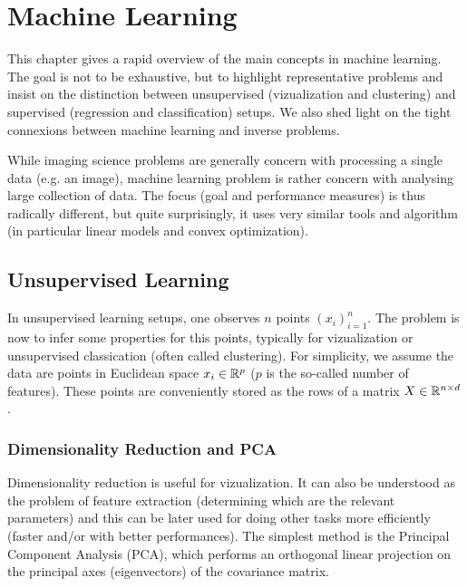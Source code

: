 
\chapter{Machine Learning}



This chapter gives a rapid overview of the main concepts in machine learning. The goal is not to be exhaustive, but to highlight representative problems and insist on the distinction between unsupervised (vizualization and clustering) and supervised (regression and classification) setups. We also shed light on the tight connexions between machine learning and inverse problems.

While imaging science problems are generally concern with processing a single data (e.g. an image), machine learning problem is rather concern with analysing large collection of data. The focus (goal and performance measures) is thus radically different, but quite surprisingly, it uses very similar tools and algorithm (in particular linear models and convex optimization). 


\section{Unsupervised Learning}

In unsupervised learning setups, one observes $n$ points $(x_i)_{i=1}^n$. 
%
The problem is now to infer some properties for this points, typically for vizualization or unsupervised classication (often called clustering). 
%
For simplicity, we assume the data are points in Euclidean space $x_i \in \mathbb{R}^p$ ($p$ is the so-called number of features). These points are conveniently stored as the rows of a matrix $X \in \mathbb{R}^{n \times d}$.


\subsection{Dimensionality Reduction and PCA}

Dimensionality reduction is useful for vizualization. It can also be understood as the problem of feature extraction (determining which are the relevant parameters) and this can be later used for doing other tasks more efficiently (faster and/or with better performances). 
%
The simplest method is the Principal Component Analysis (PCA),  which performs an orthogonal linear projection on the principal axes (eigenvectors) of the covariance matrix.

